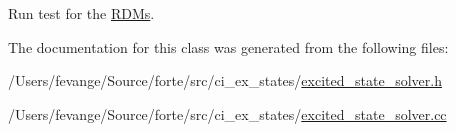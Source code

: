 Run test for the \mbox{\hyperlink{classforte_1_1_r_d_ms}{R\+D\+Ms}}. 



The documentation for this class was generated from the following files\+:\begin{DoxyCompactItemize}
\item 
/\+Users/fevange/\+Source/forte/src/ci\+\_\+ex\+\_\+states/\mbox{\hyperlink{excited__state__solver_8h}{excited\+\_\+state\+\_\+solver.\+h}}\item 
/\+Users/fevange/\+Source/forte/src/ci\+\_\+ex\+\_\+states/\mbox{\hyperlink{excited__state__solver_8cc}{excited\+\_\+state\+\_\+solver.\+cc}}\end{DoxyCompactItemize}
